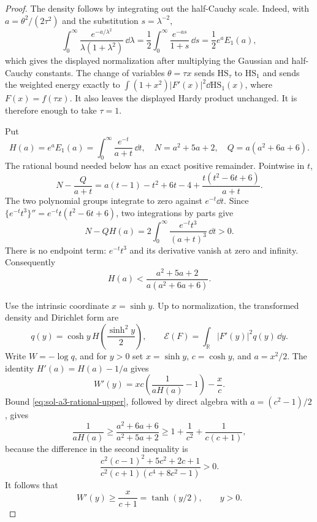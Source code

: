 \documentclass[../main.tex]{subfiles}
\begin{document}
\begin{proof}
The density follows by integrating out the half-Cauchy scale.  Indeed, with
$a=\theta^2/(2\tau^2)$ and the substitution $s=\lambda^{-2}$,
\[
 \int_0^\infty
 \frac{e^{-a/\lambda^2}}{\lambda(1+\lambda^2)}\,\dd\lambda
 =\frac12\int_0^\infty\frac{e^{-as}}{1+s}\,\dd s
 =\frac12e^aE_1(a),
\]
which gives the displayed normalization after multiplying the Gaussian and half-Cauchy
constants.  The change of variables $\theta=\tau x$ sends $\mathrm{HS}_\tau$ to
$\mathrm{HS}_1$ and sends the weighted energy exactly to
$\int(1+x^2)|F'(x)|^2\dd\mathrm{HS}_1(x)$, where $F(x)=f(\tau x)$.
It also leaves the displayed Hardy product unchanged.  It is therefore enough to take $\tau=1$.

Put
\[
 H(a)=e^aE_1(a)=\int_0^\infty\frac{e^{-t}}{a+t}\,\dd t,
 \quad N=a^2+5a+2,
 \quad Q=a(a^2+6a+6).
\]
The rational bound needed below has an exact positive remainder.  Pointwise in $t$,
\[
 N-\frac Q{a+t}
 =a(t-1)-t^2+6t-4+\frac{t(t^2-6t+6)}{a+t}.
\]
The two polynomial groups integrate to zero against $e^{-t}\dd t$.  Since
$\{e^{-t}t^3\}''=e^{-t}t(t^2-6t+6)$, two integrations by parts give
\begin{equation}
\label{eq:sol-a3-positive-remainder}
 N-QH(a)
 =2\int_0^\infty\frac{e^{-t}t^3}{(a+t)^3}\,\dd t>0.
\end{equation}
There is no endpoint term: $e^{-t}t^3$ and its derivative vanish at zero and infinity.
Consequently
\begin{equation}
\label{eq:sol-a3-rational-upper}
 H(a)<\frac{a^2+5a+2}{a(a^2+6a+6)}.
\end{equation}

Use the intrinsic coordinate $x=\sinh y$.  Up to normalization, the transformed density and
Dirichlet form are
\[
 q(y)=\cosh y\,H\!\left(\frac{\sinh^2y}{2}\right),
 \qquad
 \mathcal E(F)=\int_{\mathbb R}|F'(y)|^2q(y)\,\dd y.
\]
Write $W=-\log q$, and for $y>0$ set
$x=\sinh y$, $c=\cosh y$, and $a=x^2/2$.  The identity
$H'(a)=H(a)-1/a$ gives
\[
 W'(y)=xc\left(\frac1{aH(a)}-1\right)-\frac xc.
\]
Bound \eqref{eq:sol-a3-rational-upper}, followed by direct algebra with
$a=(c^2-1)/2$, gives
\[
 \frac1{aH(a)}
 \ge\frac{a^2+6a+6}{a^2+5a+2}
 \ge1+\frac1{c^2}+\frac1{c(c+1)},
\]
because the difference in the second inequality is
\[
 \frac{c^2(c-1)^2+5c^2+2c+1}
 {c^2(c+1)(c^4+8c^2-1)}>0.
\]
It follows that
\begin{equation}
\label{eq:sol-a3-drift}
 W'(y)\ge\frac{x}{c+1}=\tanh(y/2),
 \qquad y>0.
\end{equation}


\end{proof}
\end{document}
